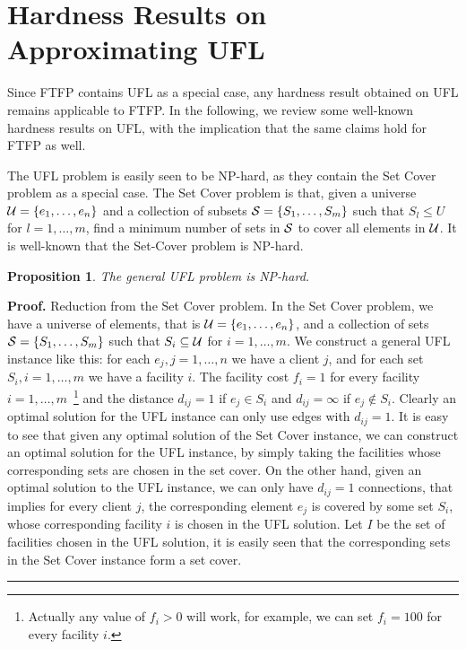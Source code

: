 \documentclass[oneside,final]{ucr}
\newtheorem{proposition}[theorem]{Proposition}
\newenvironment{proof}[1][Proof]{\textbf{#1.} }{\ \rule{0.5em}{0.5em}}
\begin{document}
\section{Hardness Results on Approximating UFL}
Since FTFP contains UFL as a special case, any hardness result
obtained on UFL remains applicable to FTFP. In the following, we
review some well-known hardness results on UFL, with the implication
that the same claims hold for FTFP as well.

The UFL problem is easily seen to be NP-hard, as they contain the Set
Cover problem as a special case. The Set Cover problem is that, given
a universe $\calU = \{e_1, \ldots, e_n\}$ and a collection of subsets
$\calS = \{S_1, \ldots, S_m\}$ such that $S_l \leq U$ for
$l=1,\ldots,m$, find a minimum number of sets in $\calS$ to cover all
elements in $\calU$. It is well-known that the Set-Cover problem is
NP-hard.

\begin{proposition}\label{prop:UFLNP}
  The general UFL problem is NP-hard.
\end{proposition}
\begin{proof}
  Reduction from the Set Cover problem. In the Set Cover problem, we
  have a universe of elements, that is $\calU = \{e_1, \ldots, e_n\}$,
  and a collection of sets $\calS = \{S_1, \ldots, S_m\}$ such that
  $S_i \subseteq \calU$ for $i=1,\ldots,m$. We construct a general UFL
  instance like this: for each $e_j, j=1,\ldots,n$ we have a client
  $j$, and for each set $S_i, i=1,\ldots,m$ we have a facility
  $i$. The facility cost $f_i=1$ for every facility
  $i=1,\ldots,m$~\footnote{Actually any value of $f_i > 0$ will work,
    for example, we can set $f_i=100$ for every facility $i$.} and the
  distance $d_{ij} = 1$ if $e_j \in S_i$ and $d_{ij} = \infty$ if $e_j
  \notin S_i$. Clearly an optimal solution for the UFL instance can
  only use edges with $d_{ij} = 1$. It is easy to see that given any
  optimal solution of the Set Cover instance, we can construct an
  optimal solution for the UFL instance, by simply taking the
  facilities whose corresponding sets are chosen in the set cover. On
  the other hand, given an optimal solution to the UFL instance, we
  can only have $d_{ij}=1$ connections, that implies for every client
  $j$, the corresponding element $e_j$ is covered by some set $S_i$,
  whose corresponding facility $i$ is chosen in the UFL solution. Let
  $I$ be the set of facilities chosen in the UFL solution, it is
  easily seen that the corresponding sets in the Set Cover instance
  form a set cover.
\end{proof}
\end{document}
